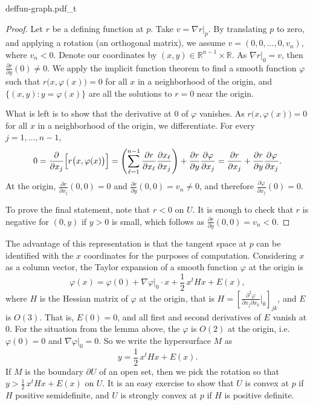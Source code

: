 \documentclass[12pt,openany]{book}
\newcommand{\R}{{\mathbb{R}}}
\theoremstyle{plain}
\theoremstyle{remark}
\theoremstyle{definition}
\newenvironment{myfig}{%
    \begin{center}
}{%
    \end{center}
}
\theoremstyle{exercise}
\theoremstyle{example}
\begin{document}
\begin{myfig}
{deffun-graph.pdf_t}
\end{myfig}

\begin{proof}
Let $r$ be a defining function at $p$.  Take $v = \nabla r|_p$.
By translating $p$ to zero, and applying a rotation (an orthogonal matrix),
we assume $v = (0,0,\ldots,0,v_n)$, where $v_n < 0$.  Denote our
coordinates by $(x,y) \in \R^{n-1} \times \R$.  As $\nabla r|_0 =
v$, then $\frac{\partial r}{\partial y}(0) \not= 0$.  We apply 
the implicit function theorem to find a
smooth function $\varphi$ such that
$r\bigl(x,\varphi(x)\bigr) = 0$ for all $x$ in a neighborhood of the
origin, and $\bigl\{ (x,y) : y=\varphi(x) \bigr\}$ are all the
solutions to $r = 0$ near the origin.

What is left is to show that the derivative at 0 of $\varphi$ vanishes.
As
$r\bigl(x,\varphi(x)\bigr) = 0$ for all $x$ in a neighborhood of the
origin, we differentiate.
For every $j=1,\ldots,n-1$,
\begin{equation*}
0 = 
\frac{\partial}{\partial x_j} \Bigl[
r\bigl(x,\varphi(x)\bigr) 
\Bigr]
=
\left(
\sum_{\ell=1}^{n-1}
\frac{\partial r}{\partial x_\ell}
\frac{\partial x_\ell}{\partial x_j}
\right)
+
\frac{\partial r}{\partial y}
\frac{\partial \varphi}{\partial x_j}
=
\frac{\partial r}{\partial x_j}
+
\frac{\partial r}{\partial y}
\frac{\partial \varphi}{\partial x_j} .
\end{equation*}
At the origin,
$\frac{\partial r}{\partial x_j}(0,0) = 0$ and
$\frac{\partial r}{\partial y}(0,0) = v_n \not= 0$, and therefore
$\frac{\partial \varphi}{\partial x_j}(0) = 0$.

To prove the final statement, note that
$r < 0$ on $U$.  It is enough to check that $r$ is
negative for $(0,y)$ if $y > 0$ is small, which follows as $\frac{\partial
r}{\partial y}(0,0) = v_n < 0$.
\end{proof}

The advantage of this representation is that the tangent space at $p$
can be identified with the $x$ coordinates for the purposes of computation.
Considering $x$ as a column vector, the Taylor expansion of a smooth function $\varphi$ at the origin is
\begin{equation*}
\varphi(x) = \varphi(0) + \nabla \varphi|_0 \cdot x + \frac{1}{2}\, x^t H x + E(x) ,
\end{equation*}
where $H$ is the Hessian matrix of $\varphi$ at the origin, that is $H = \left[
\frac{\partial^2 \varphi}{\partial x_j \partial x_k} \big|_{0} \right]_{jk}$,
and $E$ is $O(3)$.  That is, $E(0) = 0$, and
all first and second derivatives of $E$ vanish at $0$.
For the situation from the lemma above,
the $\varphi$ is $O(2)$ at the origin, i.e.\ $\varphi(0) = 0$
and $\nabla \varphi|_0 = 0$.  So we write the hypersurface
$M$ as
\begin{equation*}
y = \frac{1}{2}\, x^t H x + E(x) .
\end{equation*}
If $M$ is the boundary
$\partial U$ of an open set, then
we pick the rotation so that $y > \frac{1}{2}\,x^t H x + E(x)$ on $U$.
It is an easy exercise to show that $U$ is convex at $p$ if
$H$ positive semidefinite, and $U$ is strongly convex at $p$ if $H$ is positive definite.
\end{document}
